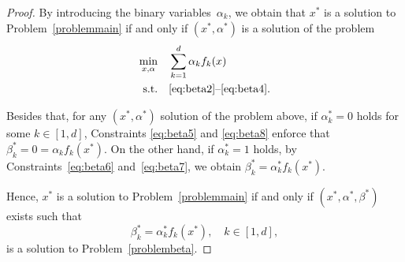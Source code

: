 \documentclass[10pt,a4paper]{amsart}
\newcommand{\st}{\text{s.t.}}
\begin{document}
\begin{proof}
  By introducing the binary variables~$\alpha_k$, we obtain that $x^*$
  is a solution to Problem~\eqref{problemmain} if and only if $(x^*,
  \alpha^*)$ is a solution of the problem
  \begin{align*}
    \min_{ x,  \alpha  } \quad
    & \sum_{k =1}^d  \alpha_k f_k(x)
    \\
    \st \quad
    &  \eqref{eq:beta2}\text{--}\eqref{eq:beta4}.
  \end{align*}

  Besides that, for any $(x^*, \alpha^*)$ solution of the problem
  above, if $\alpha_k^* = 0$ holds for some $k\in [1,d]$, Constraints
  \eqref{eq:beta5} and \eqref{eq:beta8} enforce that $\beta^*_k = 0 =
  \alpha_k f_k(x^*)$. On the other hand, if $\alpha_k^*=1$ holds, by
  Constraints~\eqref{eq:beta6} and~\eqref{eq:beta7}, we obtain
  $\beta_k^* = \alpha^*_k f_k(x^*)$.

  Hence, $x^*$ is a solution to Problem~\eqref{problemmain} if and
  only if $(x^*, \alpha^*,\beta^*)$ exists such that
  \begin{equation*}
    \beta^*_k = \alpha^*_k f_k(x^*), \quad k \in [1,d],
  \end{equation*}
  is a solution to Problem~\eqref{problembeta}.
\end{proof}
\end{document}
